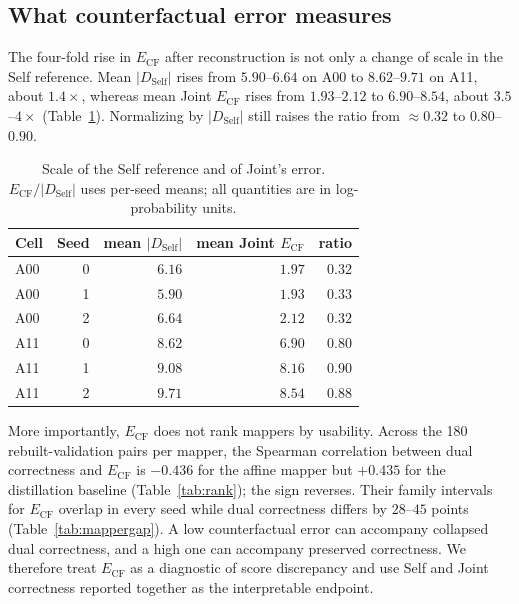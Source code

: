 \documentclass[11pt,a4paper]{article}
\begin{document}
\subsection{What counterfactual error measures}
\label{sec:validity}

The four-fold rise in $E_{\mathrm{CF}}$ after reconstruction is not only a
change of scale in the Self reference. Mean $|D_{\mathrm{Self}}|$ rises from
$5.90$--$6.64$ on A00 to $8.62$--$9.71$ on A11, about $1.4\times$, whereas mean
Joint $E_{\mathrm{CF}}$ rises from $1.93$--$2.12$ to $6.90$--$8.54$, about
$3.5$--$4\times$ (Table~\ref{tab:scale}). Normalizing by $|D_{\mathrm{Self}}|$
still raises the ratio from $\approx0.32$ to $0.80$--$0.90$.

\begin{table}[t]
\centering
\caption{Scale of the Self reference and of Joint's error.
$E_{\mathrm{CF}}/|D_{\mathrm{Self}}|$ uses per-seed means; all quantities are
in log-probability units.}
\label{tab:scale}
\begin{tabular}{lrrrr}
\toprule
Cell & Seed & mean $|D_{\mathrm{Self}}|$ & mean Joint $E_{\mathrm{CF}}$ & ratio \\
\midrule
A00 & 0 & $6.16$ & $1.97$ & $0.32$ \\
A00 & 1 & $5.90$ & $1.93$ & $0.33$ \\
A00 & 2 & $6.64$ & $2.12$ & $0.32$ \\
A11 & 0 & $8.62$ & $6.90$ & $0.80$ \\
A11 & 1 & $9.08$ & $8.16$ & $0.90$ \\
A11 & 2 & $9.71$ & $8.54$ & $0.88$ \\
\bottomrule
\end{tabular}
\end{table}

More importantly, $E_{\mathrm{CF}}$ does not rank mappers by usability. Across
the 180 rebuilt-validation pairs per mapper, the Spearman correlation between
dual correctness and $E_{\mathrm{CF}}$ is $-0.436$ for the affine mapper but
$+0.435$ for the distillation baseline
(Table~\ref{tab:rank}); the sign reverses. Their family intervals for
$E_{\mathrm{CF}}$ overlap in every seed while dual correctness differs by
$28$--$45$ points (Table~\ref{tab:mappergap}). A low counterfactual error can
accompany collapsed dual correctness, and a high one can accompany preserved
correctness. We therefore treat $E_{\mathrm{CF}}$ as a diagnostic of score
discrepancy and use Self and Joint correctness reported together as the
interpretable endpoint.
\end{document}
